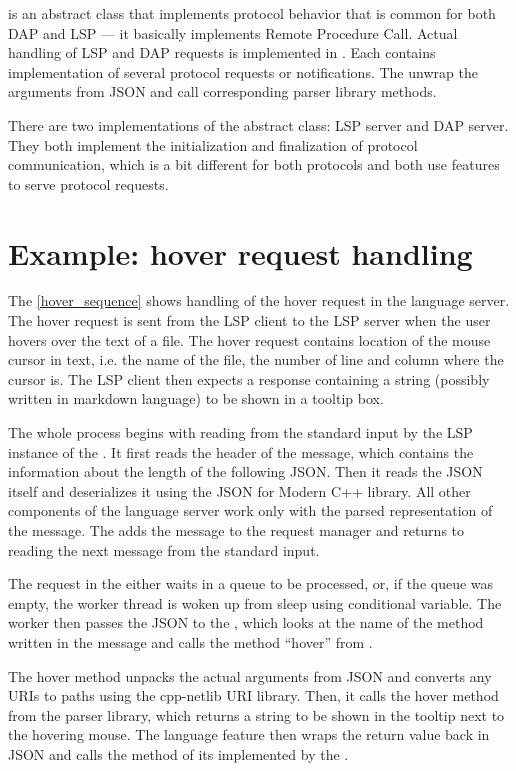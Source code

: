  is an abstract class that implements protocol behavior that is common for both DAP and LSP --- it basically implements Remote Procedure Call. Actual handling of LSP and DAP requests is implemented in . Each  contains implementation of several protocol requests or notifications. The  unwrap the arguments from JSON and call corresponding parser library methods.

There are two implementations of the abstract  class: LSP server and DAP server. They both implement the initialization and finalization of protocol communication, which is a bit different for both protocols and both use features to serve protocol requests.

\section{Example: hover request handling}

The \cref{hover_sequence} shows handling of the hover request in the language server. The hover request is sent from the LSP client to the LSP server when the user hovers over the text of a file. The hover request contains location of the mouse cursor in text, i.e. the name of the file, the number of line and column where the cursor is. The LSP client then expects a response containing a string (possibly written in markdown language) to be shown in a tooltip box.

The whole process begins with reading from the standard input by the LSP instance of the . It first reads the header of the message, which contains the information about the length of the following JSON. Then it reads the JSON itself and deserializes it using the JSON for Modern C++ library. All other components of the language server work only with the parsed representation of the message. The  adds the message to the request manager and returns to reading the next message from the standard input.

The request in the  either waits in a queue to be processed, or, if the queue was empty, the worker thread is woken up from sleep using conditional variable. The worker then passes the JSON to the , which looks at the name of the method written in the message and calls the method ``hover'' from .

The hover method unpacks the actual arguments from JSON and converts any URIs to paths using the cpp-netlib URI library. Then, it calls the hover method from the parser library, which returns a string to be shown in the tooltip next to the hovering mouse. The language feature then wraps the return value back in JSON and calls the  method of its  implemented by the .

